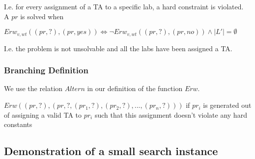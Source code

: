 \documentclass{article}
\begin{document}
I.e. for every assignment of a TA to a specific lab, a hard constraint
is violated.\\

 A $pr$ is solved when\\

\begin{center}
  $Erw_{v,wt}((pr, ?),(pr, yes)) \iff \lnot Erw_{v,wt}((pr, ?),(pr,
  no)) \land |L'| = \emptyset$

\end{center}

I.e. the problem is not unsolvable and all the labs have been assigned
a TA.

\subsubsection{Branching Definition}

We use the relation $Altern$ in our definition of the function $Erw$.


\begin{center}
$Erw((pr, ?), (pr, ?, (pr_1, ?), (pr_2, ?), ... , (pr_n, ?)))$ if $pr_i$
  is generated out of assigning a valid TA to $pr_i$ such that this
  assignment doesn't violate any hard constants
\end{center}

\subsection{Demonstration of a small search instance}
\end{document}
